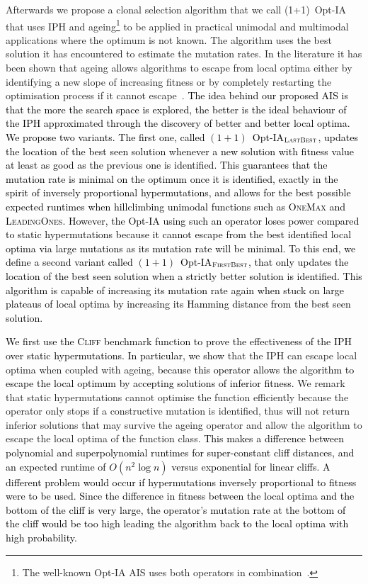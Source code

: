 \documentclass[lettersize,journal]{IEEEtran}
\newcommand{\new}[1]{\textcolor{black}{#1}}
\begin{document}
Afterwards we propose a clonal selection algorithm that we call (1+1)~Opt-IA
that uses IPH and ageing\footnote{The well-known Opt-IA AIS uses both operators in combination~\cite{CutelloNicosiaPavoneTimmis2007}.} \cite{CutelloNicosiaPavoneTimmis2007} to be applied in practical unimodal and multimodal applications where the optimum is not known. 
The algorithm uses the best solution it has encountered to estimate the mutation rates.
In the literature it has been shown that ageing allows algorithms to escape from local optima either by identifying a new slope of increasing fitness or by completely restarting the optimisation process if it cannot escape~\cite{OlivetoSudholt2014ageing,CorusOlivetoYazdaniGECCO2017,CorusOlivetoYazdaniAIJ2019,HorobaJansenZarges09,JansenZarges2011}. 
\new{The idea behind our proposed AIS is that the more the search space is explored, the better is the ideal behaviour of the IPH approximated through the discovery of better and better local optima.
We propose two variants. The first one, called $(1+1)$~Opt-IA$_{\textsc{LastBest}}$, updates the location of the best seen solution whenever a new solution with fitness value at least as good as the previous one is identified. This guarantees that the mutation rate is minimal on the optimum once it is identified, exactly in the spirit of inversely proportional hypermutations, and allows for the best possible expected runtimes when hillclimbing unimodal functions such as \textsc{OneMax} and \textsc{LeadingOnes}. However, the Opt-IA using such an operator loses power compared to static hypermutations because it cannot escape from the best identified local optima via large mutations as its mutation rate will be minimal. To this end, we define a second variant called $(1+1)$~Opt-IA$_{\textsc{FirstBest}}$, that only updates the location of the best seen solution when a strictly better solution is identified. This algorithm is capable of increasing its mutation rate again when stuck on large plateaus of local optima by increasing its Hamming distance from the best seen solution.
}

\new{We first use the \textsc{Cliff} benchmark function to prove the effectiveness of the IPH over static hypermutations. In particular, we show} 
that the IPH can escape local optima when coupled with ageing, \new{because this operator allows the algorithm to escape the local optimum by accepting solutions of inferior fitness.} We remark that static hypermutations cannot optimise the function efficiently because the operator only stops if a constructive mutation is identified, thus will not return inferior solutions that may survive the ageing operator and allow the algorithm to escape the local optima of the function class. \new{This makes a difference between polynomial and superpolynomial runtimes for super-constant cliff distances, and an expected runtime of $O(n^2 \log n)$ versus exponential for linear cliffs. 
A different problem would occur if hypermutations inversely proportional to fitness were to be used. Since the difference in fitness between the local optima and the bottom of the cliff is very large, the operator's mutation rate at the bottom of the cliff would be too high leading the algorithm back to the local optima with high probability.}
\end{document}
